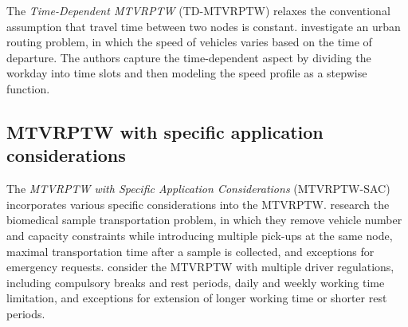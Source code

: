 The \textit{Time-Dependent MTVRPTW} (TD-MTVRPTW) relaxes the conventional assumption that travel time between two nodes is constant.  \cite{pan2021multi} investigate an urban routing problem, in which the speed of vehicles varies based on the time of departure.  The authors capture the time-dependent aspect by dividing the workday into time slots and then modeling the speed profile as a stepwise function.

\subsection{MTVRPTW with specific application considerations}

The \textit{MTVRPTW with Specific Application Considerations} (MTVRPTW-SAC) incorporates various specific considerations into the MTVRPTW.  \cite{anaya2016biomedical} research the biomedical sample transportation problem, in which they remove vehicle number and capacity constraints while introducing multiple pick-ups at the same node, maximal transportation time after a sample is collected, and exceptions for emergency requests.    \cite{benkebir2019multi} consider the MTVRPTW with multiple driver regulations, including compulsory breaks and rest periods, daily and weekly working time limitation, and exceptions for extension of longer working time or shorter rest periods.
